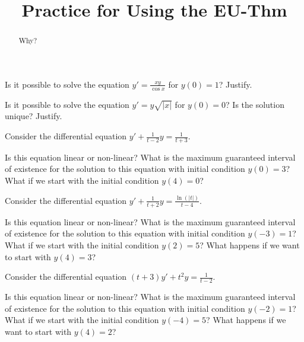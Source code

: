 \documentclass{ximera}
\title{Practice for Using the EU-Thm}
\begin{document}
\begin{abstract}
    Why?
\end{abstract}
\maketitle


\begin{exercise}
    Is it possible to solve the equation $y' = \frac{xy}{\cos x}$ for $y(0) = 1$? Justify.
\end{exercise}

\begin{exercise}
    Is it possible to solve the equation $y' = y\sqrt{\lvert x\rvert}$ for $y(0) = 0$?  Is the solution unique? Justify.
\end{exercise}

\begin{exercise}
    Consider the differential equation $y' + \frac{1}{t-2}y = \frac{1}{t+3}$. 
    \begin{tasks}
        \task Is this equation linear or non-linear?
        \task What is the maximum guaranteed interval of existence for the solution to this equation with initial condition $y(0) = 3$?
        \task What if we start with the initial condition $y(4) = 0$?
    \end{tasks}
\end{exercise}

\begin{exercise}
    Consider the differential equation $y' + \frac{1}{t+2}y = \frac{\ln(|t|)}{t-4}$. 
    \begin{tasks}
        \task Is this equation linear or non-linear?
        \task What is the maximum guaranteed interval of existence for the solution to this equation with initial condition $y(-3) = 1$?
        \task What if we start with the initial condition $y(2) = 5$?
        \task What happens if we want to start with $y(4) = 3$?
    \end{tasks}
\end{exercise}

\begin{exercise}
    Consider the differential equation $(t+3)y' + t^2 y = \frac{1}{t-2}$. 
    \begin{tasks}
        \task Is this equation linear or non-linear?
        \task What is the maximum guaranteed interval of existence for the solution to this equation with initial condition $y(-2) = 1$?
        \task What if we start with the initial condition $y(-4) = 5$?
        \task What happens if we want to start with $y(4) = 2$?
    \end{tasks}
\end{exercise}
\end{document}
